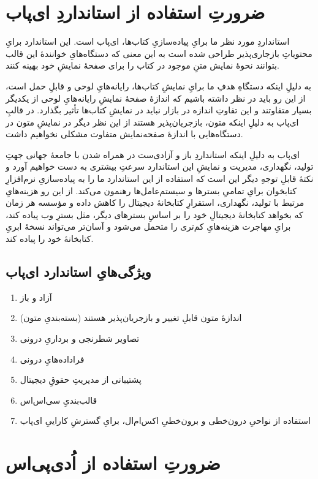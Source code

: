 \documentclass[]{article}
\begin{document}
\section{ضرورتِ استفاده از استانداردِ ای‌پاب}
استانداردِ مورد نظر ما برایِ پیاده‌سازیِ کتاب‌ها، ای‌پاب است. این استاندارد
برایِ محتویاتِ بازجاری‌پذیر
 طراحی شده است به این معنی که دستگاه‌هایِ خوانندهٔ این قالب بتوانند نحوهٔ نمایش متنِ موجود در کتاب را برای صفحهٔ نمایشِ خود بهینه کنند.

به دلیلِ اینکه دستگاهِ هدفِ ما برایِ نمایشِ کتاب‌ها، رایانه‌هایِ لوحی و قابلِ حمل ا‌ست، از این رو باید در نظر داشته باشیم که اندازهٔ صفحهٔ نمایشِ رایانه‌هایِ لوحی از یکدیگر بسیار متفاوتند و این تفاوتِ اندازه در بازار نباید در نمایشِ کتاب‌ها تأثیر بگذارد. در قالبِ ای‌پاب به دلیلِ اینکه متون، بازجریان‌پذیر هستند از این نظر دیگر در نمایشِ متون در دستگاه‌هایی با اندازهٔ صفحه‌نمایش متفاوت مشکلی نخواهیم داشت.

ای‌پاب به دلیلِ اینکه استانداردِ باز و آزادی‌ست در همراه شدن با جامعهٔ جهانی جهتِ تولید، نگهداری، مدیریت و نمایشِ این استاندارد سرعتِ بیشتری به دست خواهیم آورد و نکتهٔ قابلِ توجهِ دیگر این است که استفاده از این استاندارد ما را به پیاده‌سازیِ نرم‌افزارِ کتابخوان برایِ تمامیِ بسترها و سیستم‌عامل‌ها رهنمون می‌کند. از این رو هزینه‌هایِ مرتبط با تولید، نگهداری، استقرارِ کتابخانهٔ دیجیتال را کاهش داده و مؤسسه هر زمان که بخواهد کتابخانهٔ دیجیتالِ خود را بر اساسِ بسترهای دیگر، مثل بسترِ وب پیاده کند، برایِ مهاجرت هزینه‌هایِ کم‌تری را متحمل می‌شود و آسان‌تر می‌تواند نسخهٔ ابریِ کتابخانهٔ خود را پیاده کند.
\subsection{ویژگی‌هایِ استاندارد ای‌پاب}
\begin{enumerate}
	\item آزاد و باز
	\item اندازهٔ متون قابلِ تغییر و بازجریان‌پذیر هستند (بسته‌بندیِ متون)
	\item تصاویر شطرنجی و برداریِ درونی
	\item فراداده‌هایِ درونی
	\item پشتیبانی از مدیریتِ حقوقِ دیجیتال
	\item قالب‌بندیِ سی‌اس‌اس
	\item استفاده از نواحیِ درون‌خطی و برون‌خطیِ اکس‌ام‌ال، برایِ گسترشِ کاراییِ ای‌پاب
\end{enumerate}

\section{ضرورتِ استفاده از اُ‌دی‌پی‌اس}
\end{document}
